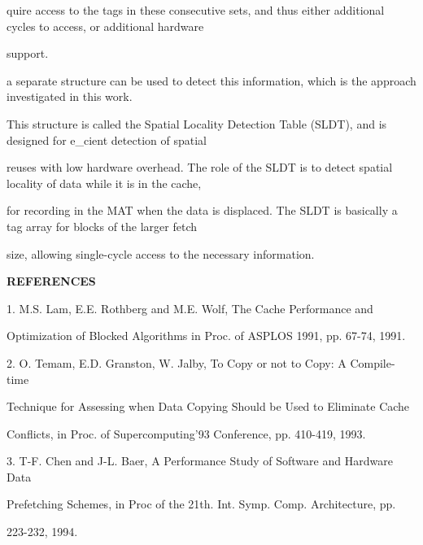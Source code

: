 \documentclass[12pt]{article}
\begin{document}
quire access to the tags in these consecutive sets, and thus either additional cycles to access, or additional hardware\par

support.{\fontsize{1pt}{1.2pt}\selectfont  \par}a separate structure can be used to detect this information, which is the approach investigated in this work.\par

This structure is called the Spatial Locality Detection Table (SLDT), and is designed for e\_cient detection of spatial\par

reuses with low hardware overhead. The role of the SLDT is to detect spatial locality of data while it is in the cache,\par

for recording in the MAT when the data is displaced. The SLDT is basically a tag array for blocks of the larger fetch\par

size, allowing single-cycle access to the necessary information.\par


\vspace{\baselineskip}
\textbf{REFERENCES}\par

1. M.S. Lam, E.E. Rothberg and M.E. Wolf, The Cache Performance and\par

Optimization of Blocked Algorithms in Proc. of ASPLOS 1991, pp. 67-74, 1991.\par

2. O. Temam, E.D. Granston, W. Jalby, To Copy or not to Copy: A Compile-time\par

Technique for Assessing when Data Copying Should be Used to Eliminate Cache\par

Conflicts, in Proc. of Supercomputing’93 Conference, pp. 410-419, 1993.\par

3. T-F. Chen and J-L. Baer, A Performance Study of Software and Hardware Data\par

Prefetching Schemes, in Proc of the 21th. Int. Symp. Comp. Architecture, pp.\par

223-232, 1994.\par
\end{document}
